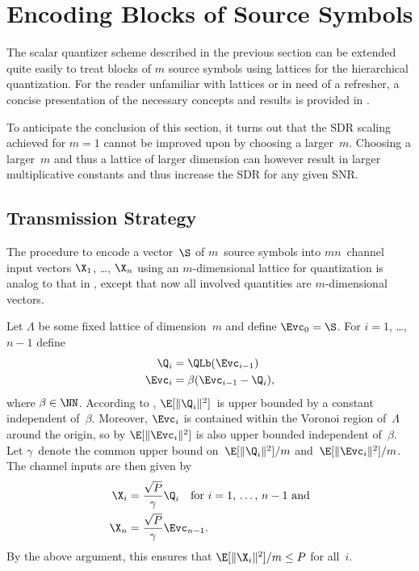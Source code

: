 

\section{Encoding Blocks of Source Symbols}\label{sec:latticequant}

The scalar quantizer scheme described in the previous section can be extended
quite easily to treat blocks of $m$ source symbols using lattices for the
hierarchical quantization. For the reader unfamiliar with lattices or in need of
a refresher, a concise presentation of the necessary concepts and results is
provided in .

To anticipate the conclusion of this section, it turns out that the SDR scaling
achieved for $m=1$ cannot be improved upon by choosing a larger~$m$. Choosing a
larger~$m$ and thus a lattice of larger dimension can however result in larger
multiplicative constants and thus increase the SDR for any given SNR.


\subsection{Transmission Strategy}

The procedure to encode a vector~$\S$ of $m$~source symbols into $mn$~channel
input vectors $\X_1$, \ldots, $\X_n$ using an $m$-dimensional lattice for
quantization is analog to that in , except that now all
involved quantities are $m$-dimensional vectors.

Let $\Lambda$ be some fixed lattice of dimension~$m$ and define $\Evc_0 = \S$.
For $i = 1$, \ldots, $n-1$ define
\begin{align}
  \Q_i &= \QLb(\Evc_{i-1})  \nonumber \\
  \Evc_i &= \beta ( \Evc_{i-1} - \Q_i), \label{eq:latticeQE}
\end{align}
where $\beta \in \NN$. According to , $\E[\|\Q_i\|^2]$~is
upper bounded by a constant independent of~$\beta$. Moreover, $\Evc_i$
is contained within the Voronoi region of~$\Lambda$ around the origin, so by
 $\E[\|\Evc_i\|^2]$ is also upper bounded independent
of~$\beta$. Let $\gamma$~denote the common upper bound on~$\E[\|\Q_i\|^2]/m$
and~$\E[\|\Evc_i\|^2]/m$.  The channel inputs are then given by
\begin{align*}
  \X_i &= \frac{\sqrt{P}}{\gamma} \Q_i \quad \text{for $i = 1$, \dots, $n-1$
  and} \\
  \X_n &= \frac{\sqrt{P}}{\gamma} \Evc_{n-1}.
\end{align*}
By the above argument, this ensures that $\E[\|\X_i\|^2]/m \le P$ for all~$i$.



